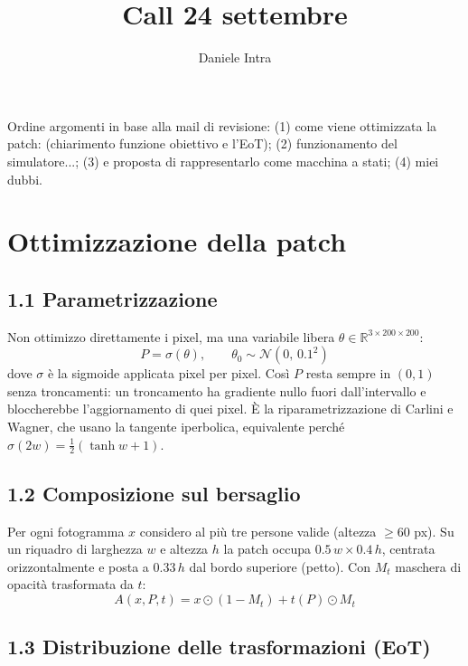 \documentclass[a4paper, 11pt]{article}
\title{Call 24 settembre}
\author{Daniele Intra}
\begin{document}
\maketitle

\noindent
Ordine argomenti in base alla mail di revisione: (1) come viene ottimizzata
la patch: (chiarimento funzione obiettivo e l'EoT); (2) funzionamento del simulatore...; (3) e proposta di
rappresentarlo come macchina a stati; (4) miei dubbi.

\section{Ottimizzazione della patch}

\subsection*{1.1 Parametrizzazione}

Non ottimizzo direttamente i pixel, ma una variabile libera
$\theta \in \mathbb{R}^{3 \times 200 \times 200}$:
\begin{equation}
P = \sigma(\theta), \qquad \theta_0 \sim \mathcal{N}(0,\, 0.1^2)
\end{equation}
dove $\sigma$ è la sigmoide applicata pixel per pixel. Così $P$ resta sempre
in $(0,1)$ senza troncamenti: un troncamento ha gradiente nullo fuori
dall'intervallo e bloccherebbe l'aggiornamento di quei pixel. È la
riparametrizzazione di Carlini e Wagner, che usano la tangente iperbolica,
equivalente perché $\sigma(2w) = \tfrac{1}{2}(\tanh w + 1)$.

\subsection*{1.2 Composizione sul bersaglio}

Per ogni fotogramma $x$ considero al più tre persone valide (altezza
$\geq 60$ px). Su un riquadro di larghezza $w$ e altezza $h$ la patch occupa
$0.5\,w \times 0.4\,h$, centrata orizzontalmente e posta a $0.33\,h$ dal bordo
superiore (petto). Con $M_t$ maschera di opacità trasformata da $t$:
\begin{equation}
A(x, P, t) = x \odot (1 - M_t) + t(P) \odot M_t
\end{equation}

\subsection*{1.3 Distribuzione delle trasformazioni (EoT)}
\end{document}
